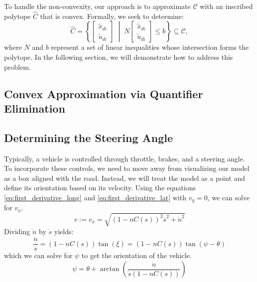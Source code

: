 To handle the non-convexity, our approach is to approximate \(\mathcal{C}\) with an inscribed polytope \(\hat{C}\) that is convex.
Formally, we seek to determine:
\begin{equation}
	\hat{C} = \left\{ \begin{bmatrix}
		\tilde{x}_{di} \\[2mm] \tilde{u}_{di}
	\end{bmatrix} \; \middle|\;
	N \begin{bmatrix}
		\tilde{x}_{di} \\[2mm] \tilde{u}_{di}
	\end{bmatrix} \leq b
	\right\} \subseteq \mathcal{C},
\end{equation}
where \(N\) and \(b\) represent a set of linear inequalities whose intersection forms the polytope.
In the following section, we will demonstrate how to address this problem.

\subsection{Convex Approximation via Quantifier Elimination}


\subsection{Determining the Steering Angle} \label{subsec:determining_the_steering_angle}
Typically, a vehicle is controlled through throttle, brakes, and a steering angle.
To incorporate these controls, we need to move away from visualizing our model as a box aligned with the road.
Instead, we will treat the model as a point and define its orientation based on its velocity.
Using the equations \eqref{eq:first_derivative_long} and \eqref{eq:first_derivative_lat} with $v_y = 0$, we can solve for $v_x$.
\begin{equation}
	v := v_x = \sqrt{(1-nC(s))^2\dot{s}^2 + \dot{n}^2}
\end{equation}
Dividing $\dot{n}$ by $\dot{s}$ yields:
\begin{equation}
	\frac{\dot{n}}{\dot{s}} = (1-nC(s))\tan(\xi) = (1-nC(s))\tan(\psi - \theta)
\end{equation}
which we can solve for $\psi$ to get the orientation of the vehicle.
\begin{equation}
	\psi = \theta + \arctan\left(\frac{\dot{n}}{\dot{s}(1-nC(s))}\right)
\end{equation}

